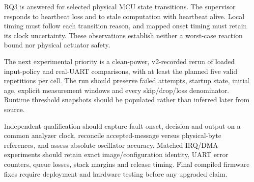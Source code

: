 \documentclass[a4paper,11pt]{article}
\begin{document}
RQ3 is answered for selected physical MCU state transitions. The supervisor responds to heartbeat loss and to stale computation with heartbeat alive. Local timing must follow each transition reason, and mapped onset timing must retain its clock uncertainty. These observations establish neither a worst-case reaction bound nor physical actuator safety.

The next experimental priority is a clean-power, v2-recorded rerun of loaded input-policy and real-UART comparisons, with at least the planned five valid repetitions per cell. The run should preserve failed attempts, startup state, initial age, explicit measurement windows and every skip/drop/loss denominator. Runtime threshold snapshots should be populated rather than inferred later from source.

Independent qualification should capture fault onset, decision and output on a common analyzer clock, reconcile accepted-message versus physical-byte references, and assess absolute oscillator accuracy. Matched IRQ/DMA experiments should retain exact image/configuration identity, UART error counters, queue losses, stack margins and release timing. Final compiled firmware fixes require deployment and hardware testing before any upgraded claim.
\end{document}
